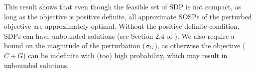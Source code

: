 This result shows that even though the feasible set of SDP is not compact, as long as the objective is positive definite, all approximate SOSPs of the perturbed objective are approximately optimal. Without the positive definite condition, SDPs can have unbounded solutions (see Section 2.4 of \citet{gartner2012approximation}). We also require a bound on the magnitude of the perturbation ($\sigma_G$), as otherwise the objective ($C+G$) can be indefinite with (too) high probability, which may result in unbounded solutions.
